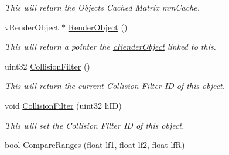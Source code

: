 \begin{DoxyCompactItemize}
\begin{DoxyCompactList}\small\item\em This will return the Objects Cached Matrix mmCache. \end{DoxyCompactList}\item 
\hypertarget{classc_collision_object_a959994c60b68de6be85dcc663228bab8}{
vRenderObject $\ast$ \hyperlink{classc_collision_object_a959994c60b68de6be85dcc663228bab8}{RenderObject} ()}
\label{classc_collision_object_a959994c60b68de6be85dcc663228bab8}

\begin{DoxyCompactList}\small\item\em This will return a pointer the \hyperlink{classc_render_object}{cRenderObject} linked to this. \end{DoxyCompactList}\item 
\hypertarget{classc_collision_object_a1490cdf75c8037049bfa7891aa8756b7}{
uint32 \hyperlink{classc_collision_object_a1490cdf75c8037049bfa7891aa8756b7}{CollisionFilter} ()}
\label{classc_collision_object_a1490cdf75c8037049bfa7891aa8756b7}

\begin{DoxyCompactList}\small\item\em This will return the current Collision Filter ID of this object. \end{DoxyCompactList}\item 
\hypertarget{classc_collision_object_a2a527f445a899adafbf18dddf140e179}{
void \hyperlink{classc_collision_object_a2a527f445a899adafbf18dddf140e179}{CollisionFilter} (uint32 liID)}
\label{classc_collision_object_a2a527f445a899adafbf18dddf140e179}

\begin{DoxyCompactList}\small\item\em This will set the Collision Filter ID of this object. \end{DoxyCompactList}\item 
\hypertarget{classc_collision_object_acc8e58a747eba8e5c7903c8d769b9b31}{
bool \hyperlink{classc_collision_object_acc8e58a747eba8e5c7903c8d769b9b31}{CompareRanges} (float lf1, float lf2, float lfR)}
\label{classc_collision_object_acc8e58a747eba8e5c7903c8d769b9b31}


\end{DoxyCompactItemize}
